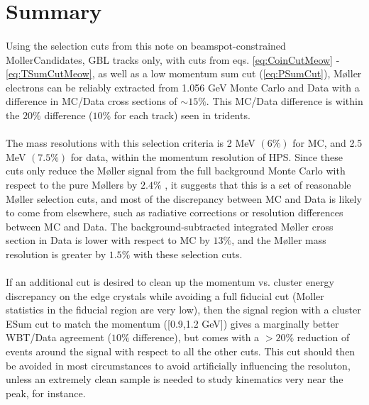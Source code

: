 \documentclass{article}
\begin{document}
\section{Summary}
\paragraph{}
Using the selection cuts from this note on beamspot-constrained MollerCandidates, GBL tracks only, with cuts from eqs. \ref{eq:CoinCutMeow} - \ref{eq:TSumCutMeow}, as well as a low momentum sum cut (\ref{eq:PSumCut}), M\o ller electrons can be reliably extracted from 1.056 GeV Monte Carlo and Data with a difference in MC/Data cross sections of $\sim 15\%$. This MC/Data difference is within the $20\%$ difference ($10\%$ for each track) seen in tridents. 
\paragraph{}
The mass resolutions with this selection criteria is 2 MeV $(6\%)$ for MC, and 2.5 MeV $(7.5\%)$ for data, within the momentum resolution of HPS. Since these cuts only reduce the M\o ller signal from the full background Monte Carlo with respect to the pure M\o llers by $2.4\%$ , it suggests that this is a set of reasonable M\o ller selection cuts, and most of the discrepancy between MC and Data is likely to come from elsewhere, such as radiative corrections or resolution differences between MC and Data. The background-subtracted integrated M\o ller cross section in Data is lower with respect to MC by $13\%$, and the M\o ller mass resolution is greater by $1.5\%$ with these selection cuts.
\paragraph{}
If an additional cut is desired to clean up the momentum vs. cluster energy discrepancy on the edge crystals while avoiding a full fiducial cut (Moller statistics in the fiducial region are very low), then the signal region with a cluster ESum cut to match the momentum ([0.9,1.2 GeV]) gives a marginally better WBT/Data agreement ($10\%$ difference), but comes with a $>20\%$ reduction of events around the signal with respect to all the other cuts. This cut should then be avoided in most circumstances to avoid artificially influencing the resoluton, unless an extremely clean sample is needed to study kinematics very near the peak, for instance.
\end{document}
